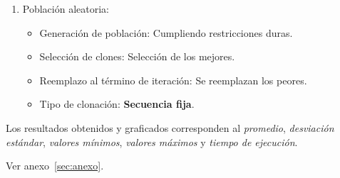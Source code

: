 \begin{enumerate}
	\item Población aleatoria:

		\begin{itemize}
			\item Generación de población: Cumpliendo restricciones duras.
			\item Selección de clones: Selección de los mejores.
			\item Reemplazo al término de iteración:  Se reemplazan los peores.
			\item Tipo de clonación: \textbf{Secuencia fija}.
		\end{itemize}

\end{enumerate}

Los resultados obtenidos y graficados corresponden al \emph{promedio}, \emph{desviación estándar},
\emph{valores mínimos}, \emph{valores máximos} y \emph{tiempo de ejecución}.


Ver anexo~\ref{sec:anexo}.
